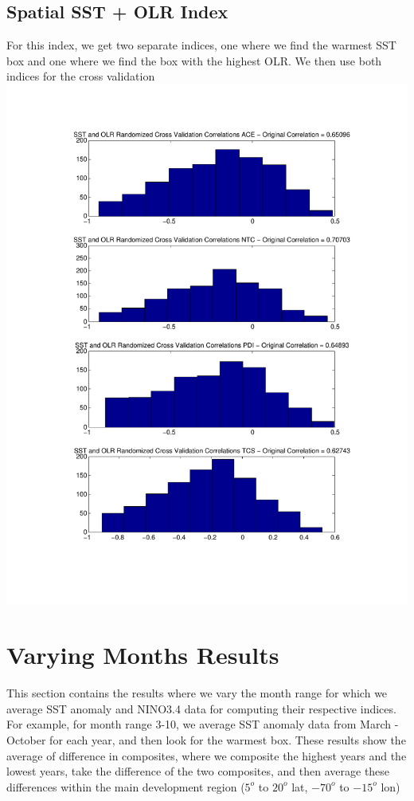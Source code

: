 \documentclass[11pt]{article}
\begin{document}
\subsection{Spatial SST + OLR Index}
For this index, we get two separate indices, one where we find the warmest SST box and one where we find the box with the highest OLR.  We then use both indices for the cross validation \newline
\includegraphics [scale = 0.6]{images/randomizedCrossValidationSSTAndOLR.pdf}
\newpage
\section{Varying Months Results}
This section contains the results where we vary the month range for which we average SST anomaly and NINO3.4 data for computing their respective indices.  For example, for month range 3-10, we average SST anomaly data from March - October for each year, and then look for the warmest box.  These results show the average of difference in composites, where we composite the highest years and the lowest years, take the difference of the two composites, and then average these differences within the main development region ($5^o$ to $20^o$ lat, $-70^o$ to $-15^o$ lon)
\end{document}
